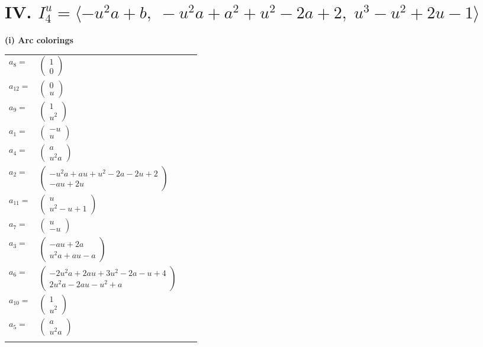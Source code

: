 \documentclass[1p]{elsarticle_modified}
\theoremstyle{definition}
\begin{document}
\centering \section*{IV. $I^u_{4}= \langle - u^2 a+b,\;- u^2 a+a^2+u^2-2 a+2,\;u^3- u^2+2 u-1 \rangle$}
\flushleft \textbf{(i) Arc colorings}\\
\begin{tabular}{m{7pt} m{180pt} m{7pt} m{180pt} }
\flushright $a_{8}=$&$\begin{pmatrix}1\\0\end{pmatrix}$ \\
\flushright $a_{12}=$&$\begin{pmatrix}0\\u\end{pmatrix}$ \\
\flushright $a_{9}=$&$\begin{pmatrix}1\\u^2\end{pmatrix}$ \\
\flushright $a_{1}=$&$\begin{pmatrix}- u\\u\end{pmatrix}$ \\
\flushright $a_{4}=$&$\begin{pmatrix}a\\u^2 a\end{pmatrix}$ \\
\flushright $a_{2}=$&$\begin{pmatrix}- u^2 a+a u+u^2-2 a-2 u+2\\- a u+2 u\end{pmatrix}$ \\
\flushright $a_{11}=$&$\begin{pmatrix}u\\u^2- u+1\end{pmatrix}$ \\
\flushright $a_{7}=$&$\begin{pmatrix}u\\- u\end{pmatrix}$ \\
\flushright $a_{3}=$&$\begin{pmatrix}- a u+2 a\\u^2 a+a u- a\end{pmatrix}$ \\
\flushright $a_{6}=$&$\begin{pmatrix}-2 u^2 a+2 a u+3 u^2-2 a- u+4\\2 u^2 a-2 a u- u^2+a\end{pmatrix}$ \\
\flushright $a_{10}=$&$\begin{pmatrix}1\\u^2\end{pmatrix}$ \\
\flushright $a_{5}=$&$\begin{pmatrix}a\\u^2 a\end{pmatrix}$\\&\end{tabular}
\end{document}
